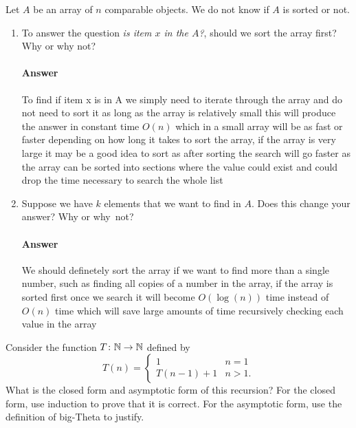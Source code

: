 \documentclass{article}
\begin{document}
\collab{\todo{}}
Let $A$ be an array of $n$ comparable objects.  We do not know if $A$ is sorted
or not.

\begin{enumerate}
	\item To answer the question \emph{is item $x$ in the $A$?}, should we
	      sort the array first?  Why or why not?

	      \paragraph{Answer}

To find if item x is in A we simply need to iterate through the array and do not need to sort it as long as the array is relatively small
this will produce the answer in constant time $O(n)$ which in a small array will be as fast or faster depending on how long it takes to sort the array, if the array
is very large it may be a good idea to sort as after sorting the search will go faster as the array can be sorted into sections where the value could exist and
could drop the time necessary to search the whole list

	\item Suppose we have $k$ elements that we want to find in $A$. Does this
	      change your answer? Why or why~not?

	      \paragraph{Answer}

We should definetely sort the array if we want to find more than a single number, such as finding all copies of a number in the array,
if the array is sorted first once we search it will become $O(\log(n))$ time instead of $O(n)$ time which will save large amounts of time recursively
checking each value in the array

\end{enumerate}

\collab{\todo{}}
Consider the function $T \colon {\mathbb N} \to {\mathbb N}$ defined by
\[T (n) = \begin{cases}
		1        & n=1  \\
		T(n-1)+1 & n>1.
	\end{cases}
\]
What is the closed form and asymptotic form of this recursion?  For the
closed form, use induction to prove that it is correct.  For the asymptotic
form, use the definition of big-Theta to justify.
\end{document}
